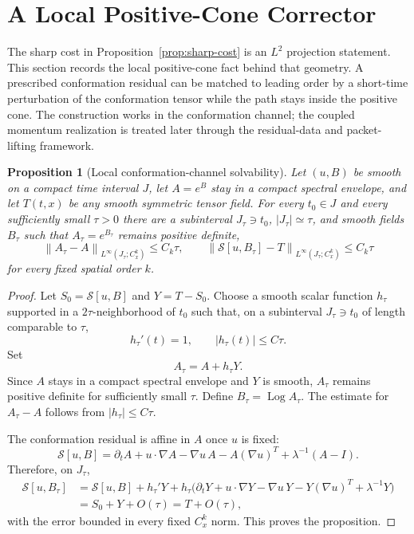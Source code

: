 \documentclass[11pt]{article}
\numberwithin{equation}{section}
\newtheorem{proposition}[theorem]{Proposition}
\newcommand{\Log}{\operatorname{Log}}
\newcommand{\norm}[1]{\left\lVert #1\right\rVert}
\begin{document}
\section{A Local Positive-Cone Corrector}
\label{sec:local-corrector}

The sharp cost in Proposition~\ref{prop:sharp-cost} is an $L^2$
projection statement.  This section records the local positive-cone fact behind
that geometry.  A prescribed conformation residual can be matched to leading
order by a short-time perturbation of the conformation tensor while the path
stays inside the positive cone.  The construction works in the conformation
channel; the coupled momentum realization is treated later through the
residual-data and packet-lifting framework.

\begin{proposition}[Local conformation-channel solvability]
\label{prop:local-conformation-solvability}
Let $(u,B)$ be smooth on a compact time interval $J$, let $A=e^B$ stay in a
compact spectral envelope, and let $T(t,x)$ be any smooth symmetric tensor field.
For every $t_0\in J$ and every sufficiently small $\tau>0$ there are a
subinterval $J_\tau\ni t_0$, $|J_\tau|\simeq\tau$, and smooth fields
$B_\tau$ such that $A_\tau=e^{B_\tau}$ remains positive definite,
\[
  \norm{A_\tau-A}_{L^\infty(J_\tau;C^k_x)}\le C_k\tau,
  \qquad
  \norm{\mathcal S[u,B_\tau]-T}_{L^\infty(J_\tau;C^k_x)}\le C_k\tau
\]
for every fixed spatial order $k$.
\end{proposition}

\begin{proof}
Let $S_0=\mathcal S[u,B]$ and $Y=T-S_0$.  Choose a smooth scalar function
$h_\tau$ supported in a $2\tau$-neighborhood of $t_0$ such that, on a
subinterval $J_\tau\ni t_0$ of length comparable to $\tau$,
\[
  h_\tau'(t)=1,
  \qquad
  |h_\tau(t)|\le C\tau .
\]
Set
\[
  A_\tau=A+h_\tau Y .
\]
Since $A$ stays in a compact spectral envelope and $Y$ is smooth, $A_\tau$
remains positive definite for sufficiently small $\tau$.  Define
$B_\tau=\Log A_\tau$.  The estimate for $A_\tau-A$ follows from
$|h_\tau|\le C\tau$.

The conformation residual is affine in $A$ once $u$ is fixed:
\[
  \mathcal S[u,B]
  =\partial_tA+u\cdot\nabla A-\nabla u\,A-A(\nabla u)^T
  +\lambda^{-1}(A-I).
\]
Therefore, on $J_\tau$,
\begin{align*}
  \mathcal S[u,B_\tau]
  &=\mathcal S[u,B]+h_\tau'Y
    +h_\tau\bigl(\partial_tY+u\cdot\nabla Y
      -\nabla u\,Y-Y(\nabla u)^T+\lambda^{-1}Y\bigr)\\
  &=S_0+Y+O(\tau)=T+O(\tau),
\end{align*}
with the error bounded in every fixed $C^k_x$ norm.  This proves the
proposition.
\end{proof}
\end{document}
